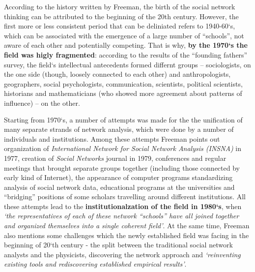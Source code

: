 \documentclass[11pt]{article} %
\begin{document}
According to the history written by Freeman, the birth of the social network thinking can be attributed to the beginning of the 20th century. However, the first more or less consistent period that can be deliniated refers to 1940-60`s, which can be associated with the emergence of a large number of “schools”, not aware of each other and potentially competing. That is why, \textbf{by the 1970`s the field was higly fragmented}: according to the results of the “founding fathers” survey, the field`s intellectual antecedents formed differnt groups -- sociologists, on the one side (though, loosely connected to each other) and anthropologists, geographers, social psychologists, communication, scientists, political scientists, historians and mathematicians (who showed more agreement about patterns of influence) -- on the other. \medskip 

Starting from 1970`s, a number of attempts was made for the the unification of many separate strands of network analysis, which were done by a number of individuals and institutions. Among these attempts Freeman points out organization of \textit{International Network for Social Network Analysis (INSNA)} in 1977, creation of \textit{Social Networks} journal in 1979, conferences and regular meetings that brought separate groups together (including those connected by early kind of Internet), the appearance of computer programs standardizing analysis of social network data, educational programs at the universities and “bridging” positions of some scholars travelling around different institutions. All these attempts lead to the \textbf{institutionalzation of the field in 1980`s}, when \textit{`the representatives of each of these network “schools” have all joined together and organized themselves into a single coherent field'}\citep{SNAdev}. At the same time, Freeman also mentions some challenges which the newly established field was facing in the beginning of 20`th century - the split between the traditional social network analysts and the physicists, discovering the network approach and \textit{`reinventing existing tools and rediscovering established empirical results'}. \medskip 
\end{document}
